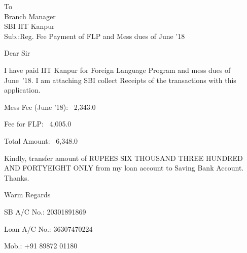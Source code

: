 \documentclass{letter}
\date{July 17,2018}
\begin{document}
\begin{letter}{To \\ Branch Manager \\ SBI IIT Kanpur \\ Sub.:Reg. Fee Payment of FLP and Mess dues of June '18}
\opening{Dear Sir}
I have paid IIT Kanpur for Foreign Language Program and mess dues of June~'18. I am attaching SBI collect Receipts of the transactions  with this application. \par
Mess Fee (June '18): \rupee~2,343.0 \par 
Fee for FLP: \rupee~4,005.0 \par 
\vspace{0.5em}
\hline

Total Amount: \rupee~6,348.0 \par
Kindly, transfer amount of RUPEES SIX THOUSAND THREE HUNDRED AND FORTYEIGHT ONLY from my loan account to Saving Bank Account. Thanks.
\closing{Warm Regards}

SB A/C No.: 20301891869\par
Loan A/C No.: 36307470224\par
Mob.: +91 89872 01180\par
\end{letter}
\end{document}
